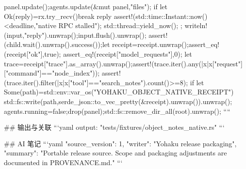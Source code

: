 {{{{                panel.update();agents.update(&mut panel,"files");
                if let Ok(reply)=rx.try_recv(){break reply}
                assert!(std::time::Instant::now()<deadline,"native RPC stalled");
                std::thread::yield_now();
            };
            writeln!(input,"{reply}").unwrap();input.flush().unwrap();
        }
        assert!(child.wait().unwrap().success());let receipt=receipt.unwrap();assert_eq!(receipt["ok"],true);
        assert_eq!(receipt["model_requests"],0);
        let trace=receipt["trace"].as_array().unwrap();assert!(trace.iter().any(|x|x["request"]["command"]=="node_index"));
        assert!(trace.iter().filter(|x|x["tool"]=="search_notes").count()>=8);
        if let Some(path)=std::env::var_os("YOHAKU_OBJECT_NATIVE_RECEIPT") {std::fs::write(path,serde_json::to_vec_pretty(&receipt).unwrap()).unwrap();}
        agents.running=false;drop(panel);std::fs::remove_dir_all(root).unwrap();
    }
}
````

## 输出与关联
```yaml
output: "tests/fixtures/object_notes_native.rs"
```

## AI 笔记
```yaml
{"source_version": 1, "writer": "Yohaku release packaging", "summary": "Portable release source. Scope and packaging adjustments are documented in PROVENANCE.md."}
```
